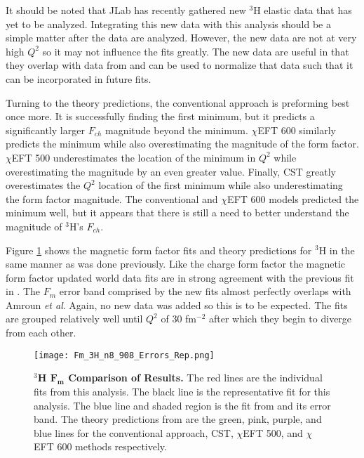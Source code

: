 It should be noted that JLab has recently gathered new $^3$H elastic data that has yet to be analyzed. Integrating this new data with this analysis should be a simple matter after the data are analyzed. However, the new data are not at very high $Q^2$ so it may not influence the fits greatly. The new data are useful in that they overlap with data from \cite{Article:Beck82} and can be used to normalize that data such that it can be incorporated in future fits.

Turning to the theory predictions, the conventional approach is preforming best once more. It is successfully finding the first minimum, but it predicts a significantly larger $F_{ch}$ magnitude beyond the minimum. $\chi$EFT 600 similarly predicts the minimum while also overestimating the magnitude of the form factor. $\chi$EFT 500 underestimates the location of the minimum in $Q^2$ while overestimating the magnitude by an even greater value. Finally, CST greatly overestimates the $Q^2$ location of the first minimum while also underestimating the form factor magnitude. The conventional and $\chi$EFT 600 models predicted the minimum well, but it appears that there is still a need to better understand the magnitude of $^3$H's $F_{ch}$.

Figure \ref{fig:3h_fm_theory} shows the magnetic form factor fits and theory predictions for $^3$H in the same manner as was done previously. Like the charge form factor the magnetic form factor updated world data fits are in strong agreement with the previous fit in \cite{Article:Amroun}. The $F_m$ error band comprised by the new fits almost perfectly overlaps with Amroun \textit{et al}. Again, no new data was added so this is to be expected. The fits are grouped relatively well until $Q^2$ of 30 fm$^{-2}$ after which they begin to diverge from each other. 

\begin{figure}[!ht]
	\begin{center}
	\texttt{[image: Fm\_3H\_n8\_908\_Errors\_Rep.png]}
	\end{center}
	\caption[$^3$H $F_m$ Comparison of Results]{
	{\bf{$^3$H $\boldsymbol{F_m}$ Comparison of Results.}} The red lines are the individual fits from this analysis. The black line is the representative fit for this analysis. The blue line and shaded region is the fit from \cite{Article:Amroun} and its error band. The theory predictions from \cite{Article:Marcucci} are the green, pink, purple, and blue lines for the conventional approach, CST, $\chi$EFT 500, and $\chi$EFT 600 methods respectively.}
	\label{fig:3h_fm_theory}
\end{figure}

